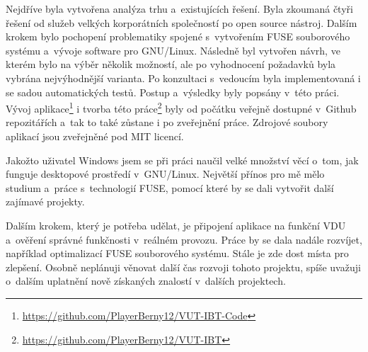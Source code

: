 Nejdříve byla vytvořena analýza trhu a existujících řešení. Byla zkoumaná čtyři řešení od služeb velkých korporátních společností po open source nástroj.
Dalším krokem bylo pochopení problematiky spojené s vytvořením FUSE souborového systému a vývoje software pro GNU/Linux. Následně byl vytvořen návrh,
ve kterém bylo na výběr několik možností, ale po vyhodnocení požadavků byla vybrána nejvýhodnější varianta. Po konzultaci s vedoucím byla implementovaná
i se sadou automatických testů. Postup a výsledky byly popsány v této práci. Vývoj aplikace\footnote{\url{https://github.com/PlayerBerny12/VUT-IBT-Code}}
i tvorba této práce\footnote{\url{https://github.com/PlayerBerny12/VUT-IBT}} byly od počátku veřejně dostupné v Github repozitářích a tak to také zůstane 
i po zveřejnění práce. Zdrojové soubory aplikací jsou zveřejněné pod MIT licencí.

Jakožto uživatel Windows jsem se při práci naučil velké množství věcí o tom, jak funguje desktopové prostředí v GNU/Linux. Největší přínos pro mě mělo
studium a práce s technologií FUSE, pomocí které by se dali vytvořit další zajímavé projekty.

Dalším krokem, který je potřeba udělat, je připojení aplikace na funkční VDU a ověření správné funkčnosti v reálném provozu. Práce by se dala nadále
rozvíjet, například optimalizací FUSE souborového systému. Stále je zde dost místa pro zlepšení. Osobně neplánuji věnovat další čas rozvoji tohoto projektu, 
spíše uvažuji o dalším uplatnění nově získaných znalostí v dalších projektech.